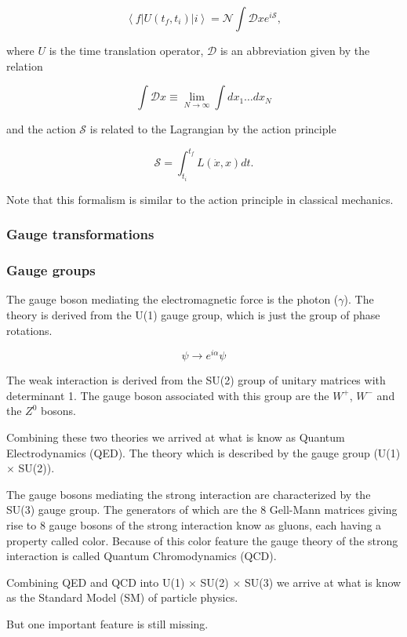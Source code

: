 \begin{equation}
	\left \langle f \right | U(t_f,t_i) \left | i \right \rangle = \mathcal{N} \int \mathcal{D}x e^{i\mathcal{S}},
\end{equation}

where $U$ is the time translation operator, $\mathcal{D}$ is an abbreviation given by the relation 

\begin{equation}
	\int \mathcal{D} x \equiv \lim_{N \to \infty} \int dx_1 \dots dx_N
\end{equation}

and the action $\mathcal{S}$ is related to the Lagrangian by the action principle

\begin{equation}
	\mathcal{S} = \int_{t_i}^{t_f} L(\dot{x},x)dt.
\end{equation}

Note that this formalism is similar to the action principle in classical mechanics.

\subsubsection{Gauge transformations}

\subsubsection{Gauge groups}
The gauge boson mediating the electromagnetic force is the photon ($\gamma$). The theory is derived from the U(1) gauge group, which is just the group of phase rotations.

\begin{equation}
    \psi \rightarrow e^{i\alpha} \psi
\end{equation}

The weak interaction is derived from the SU(2) group of unitary matrices with determinant 1. The gauge boson associated with this group are the $W^+$, $W^-$ and the $Z^0$ bosons.

Combining these two theories we arrived at what is know as Quantum Electrodynamics (QED). The theory which is described by the gauge group (U(1) $\times$ SU(2)).

The gauge bosons mediating the strong interaction are characterized by the SU(3) gauge group. The generators of which are the 8 Gell-Mann matrices giving rise to 8 gauge bosons of the strong interaction know as gluons, each having a property called color. Because of this color feature the gauge theory of the strong interaction is called Quantum Chromodynamics (QCD).

Combining QED and QCD into U(1) $\times$ SU(2) $\times$ SU(3) we arrive at what is know as the Standard Model (SM) of particle physics.

But one important feature is still missing.

